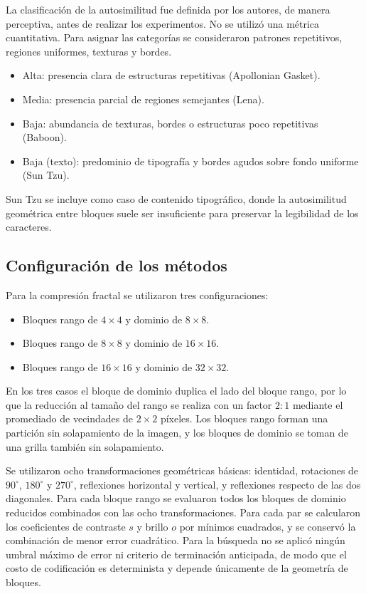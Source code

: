 \documentclass[a4paper]{llncs}
\begin{document}
La clasificación de la autosimilitud fue definida por los autores, de manera perceptiva, antes de realizar los experimentos. No se utilizó una métrica cuantitativa. Para asignar las categorías se consideraron patrones repetitivos, regiones uniformes, texturas y bordes.

\begin{itemize}
    \item Alta: presencia clara de estructuras repetitivas (Apollonian Gasket).
    \item Media: presencia parcial de regiones semejantes (Lena).
    \item Baja: abundancia de texturas, bordes o estructuras poco repetitivas (Baboon).
    \item Baja (texto): predominio de tipografía y bordes agudos sobre fondo uniforme (Sun Tzu).
\end{itemize}

Sun Tzu se incluye como caso de contenido tipográfico, donde la autosimilitud geométrica entre bloques suele ser insuficiente para preservar la legibilidad de los caracteres.

\subsection{Configuración de los métodos}

Para la compresión fractal se utilizaron tres configuraciones:

\begin{itemize}
    \item Bloques rango de $4\times4$ y dominio de $8\times8$.
    \item Bloques rango de $8\times8$ y dominio de $16\times16$.
    \item Bloques rango de $16\times16$ y dominio de $32\times32$.
\end{itemize}

En los tres casos el bloque de dominio duplica el lado del bloque rango, por lo que la reducción al tamaño del rango se realiza con un factor $2{:}1$ mediante el promediado de vecindades de $2\times2$ píxeles. Los bloques rango forman una partición sin solapamiento de la imagen, y los bloques de dominio se toman de una grilla también sin solapamiento.

Se utilizaron ocho transformaciones geométricas básicas: identidad, rotaciones de $90^\circ$, $180^\circ$ y $270^\circ$, reflexiones horizontal y vertical, y reflexiones respecto de las dos diagonales. Para cada bloque rango se evaluaron todos los bloques de dominio reducidos combinados con las ocho transformaciones. Para cada par se calcularon los coeficientes de contraste $s$ y brillo $o$ por mínimos cuadrados, y se conservó la combinación de menor error cuadrático. Para la búsqueda no se aplicó ningún umbral máximo de error ni criterio de terminación anticipada, de modo que el costo de codificación es determinista y depende únicamente de la geometría de bloques.
\end{document}
